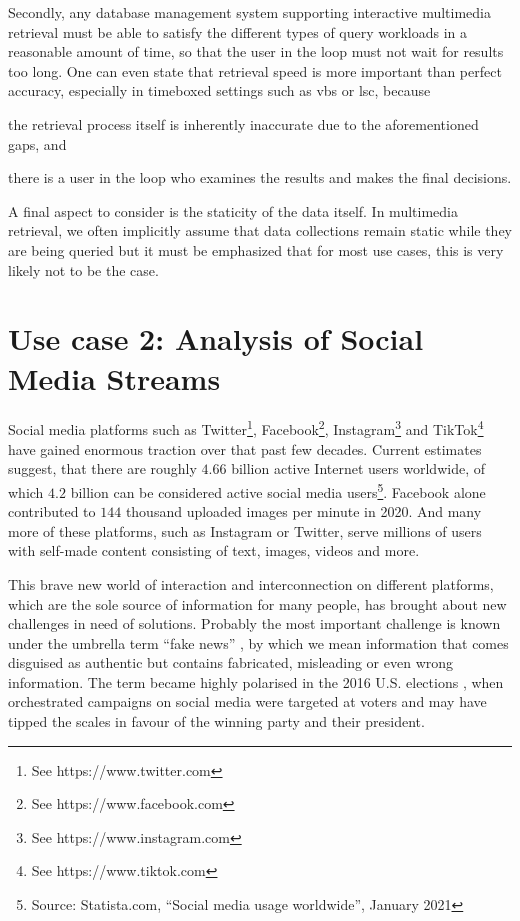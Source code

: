 Secondly, any database management system supporting interactive multimedia retrieval must be able to satisfy the different types of query workloads in a reasonable amount of time, so that the user in the loop must not wait for results too long. One can even state that retrieval speed is more important than perfect accuracy, especially in timeboxed settings such as \acrshort{vbs} or \acrshort{lsc}, because
\begin{enumerate*}[label=(\roman*)]
    \item the retrieval process itself is inherently inaccurate due to the aforementioned gaps, and
    \item there is a user in the loop who examines the results and makes the final decisions.
\end{enumerate*}

A final aspect to consider is the staticity of the data itself. In multimedia retrieval, we often implicitly assume that data collections remain static while they are being queried but it must be emphasized that for most use cases, this is very likely not to be the case. 

\section{Use case 2: Analysis of Social Media Streams}
\label{section:application_online_analysis}

Social media platforms such as Twitter\footnote{See https://www.twitter.com}, Facebook\footnote{See https://www.facebook.com}, Instagram\footnote{See https://www.instagram.com} and TikTok\footnote{See https://www.tiktok.com} have gained enormous traction over that past few decades. Current estimates suggest, that there are roughly $4.66$ billion active Internet users worldwide, of which $4.2$ billion can be considered active social media users\footnote{Source: Statista.com, ``Social media usage worldwide'', January 2021}. Facebook alone contributed to $144$ thousand uploaded images per minute in 2020. And many more of these  platforms, such as Instagram or Twitter, serve millions of users with self-made content consisting of text, images, videos and more.

This brave new world of interaction and interconnection on different platforms, which are the sole source of information for many people, has brought about new challenges in need of solutions. Probably the most important challenge is known under the umbrella term ``fake news'' \cite{Lazer:2018Science}, by which we mean information that comes disguised as authentic but contains fabricated, misleading or even wrong information. The term became highly polarised in the 2016 U.S. elections \cite{Quandt:2019Fake}, when orchestrated campaigns on social media were targeted at voters and may have tipped the scales in favour of the winning party and their president.

